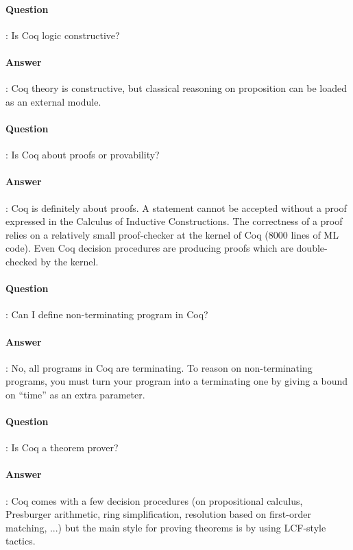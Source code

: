 \documentclass{article}
\begin{document}
\paragraph{Question}: Is Coq logic constructive?

\paragraph{Answer}: Coq theory is constructive, but classical
reasoning on proposition can be loaded as an external module.

\paragraph{Question}: Is Coq about proofs or provability?

\paragraph{Answer}: Coq is definitely about proofs. A statement
cannot be accepted without a proof expressed in the Calculus of
Inductive Constructions. The correctness of a proof relies on a
relatively small proof-checker at the kernel of Coq (8000 lines of ML
code). Even Coq decision procedures are producing proofs which are
double-checked by the kernel.

\paragraph{Question}: Can I define non-terminating program in Coq?

\paragraph{Answer}: No, all programs in Coq are terminating. To
reason on non-terminating programs, you must turn your program into a
terminating one by giving a bound on ``time'' as an extra parameter.

\paragraph{Question}: Is Coq a theorem prover?

\paragraph{Answer}: Coq comes with a few decision procedures (on
propositional calculus, Presburger arithmetic, ring simplification,
resolution based on first-order matching, ...) but the main style for
proving theorems is by using LCF-style tactics.
\end{document}
